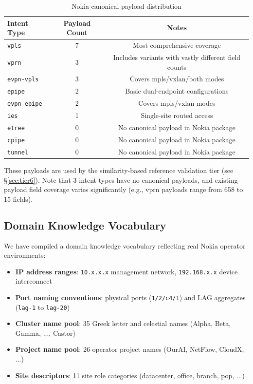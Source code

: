 \documentclass[12pt, a4paper]{article}
\newcommand{\intenttype}[1]{\texttt{#1}}
\begin{document}
\begin{table}[H]
\centering
\caption{Nokia canonical payload distribution}
\label{tab:canonical-payloads}
\small
\begin{tabular}{lcc}
\toprule
\textbf{Intent Type} & \textbf{Payload Count} & \textbf{Notes} \\
\midrule
\intenttype{vpls}        & 7 & Most comprehensive coverage \\
\intenttype{vprn}        & 3 & Includes variants with vastly different field counts \\
\intenttype{evpn-vpls}   & 3 & Covers mpls/vxlan/both modes \\
\intenttype{epipe}       & 2 & Basic dual-endpoint configurations \\
\intenttype{evpn-epipe}  & 2 & Covers mpls/vxlan modes \\
\intenttype{ies}         & 1 & Single-site routed access \\
\midrule
\intenttype{etree}       & 0 & No canonical payload in Nokia package \\
\intenttype{cpipe}       & 0 & No canonical payload in Nokia package \\
\intenttype{tunnel}      & 0 & No canonical payload in Nokia package \\
\bottomrule
\end{tabular}
\end{table}

\noindent
These payloads are used by the similarity-based reference validation tier (see \S\ref{sec:tier6}). Note that 3 intent types have no canonical payloads, and existing payload field coverage varies significantly (e.g., vprn payloads range from 658 to 15 fields).

\subsection{Domain Knowledge Vocabulary}

We have compiled a domain knowledge vocabulary reflecting real Nokia operator environments:

\begin{itemize}
  \item \textbf{IP address ranges}: \texttt{10.x.x.x} management network, \texttt{192.168.x.x} device interconnect
  \item \textbf{Port naming conventions}: physical ports (\texttt{1/2/c4/1}) and LAG aggregates (\texttt{lag-1} to \texttt{lag-20})
  \item \textbf{Cluster name pool}: 35 Greek letter and celestial names (Alpha, Beta, Gamma, ..., Castor)
  \item \textbf{Project name pool}: 26 operator project names (OurAI, NetFlow, CloudX, ...)
  \item \textbf{Site descriptors}: 11 site role categories (datacenter, office, branch, pop, ...)
\end{itemize}
\end{document}
